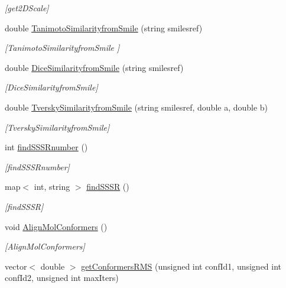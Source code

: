\begin{DoxyCompactItemize}
\begin{DoxyCompactList}\small\item\em \mbox{[}get2\+D\+Scale\mbox{]} \end{DoxyCompactList}\item 
double \mbox{\hyperlink{class_molecule_a2f83a282a6276fb330b46831a29907d6}{Tanimoto\+Similarityfrom\+Smile}} (string smilesref)
\begin{DoxyCompactList}\small\item\em \mbox{[}Tanimoto\+Similarityfrom\+Smile \mbox{]} \end{DoxyCompactList}\item 
double \mbox{\hyperlink{class_molecule_a5dcf9622623a09d43d9a2bc9d381a67e}{Dice\+Similarityfrom\+Smile}} (string smilesref)
\begin{DoxyCompactList}\small\item\em \mbox{[}Dice\+Similarityfrom\+Smile\mbox{]} \end{DoxyCompactList}\item 
double \mbox{\hyperlink{class_molecule_ae2126d53ee2e1488eb7d105c6b02a604}{Tversky\+Similarityfrom\+Smile}} (string smilesref, double a, double b)
\begin{DoxyCompactList}\small\item\em \mbox{[}Tversky\+Similarityfrom\+Smile\mbox{]} \end{DoxyCompactList}\item 
int \mbox{\hyperlink{class_molecule_aaca41709fb5306fbfd11f4a75664e2ed}{find\+S\+S\+S\+Rnumber}} ()
\begin{DoxyCompactList}\small\item\em \mbox{[}find\+S\+S\+S\+Rnumber\mbox{]} \end{DoxyCompactList}\item 
map$<$ int, string $>$ \mbox{\hyperlink{class_molecule_a553c6c6f1543156da2ff00c859f6b508}{find\+S\+S\+SR}} ()
\begin{DoxyCompactList}\small\item\em \mbox{[}find\+S\+S\+SR\mbox{]} \end{DoxyCompactList}\item 
void \mbox{\hyperlink{class_molecule_adc6886a60ec1e7f55ba07d7f2be72e68}{Align\+Mol\+Conformers}} ()
\begin{DoxyCompactList}\small\item\em \mbox{[}Align\+Mol\+Conformers\mbox{]} \end{DoxyCompactList}\item 
vector$<$ double $>$ \mbox{\hyperlink{class_molecule_a98b0a89a7c6275eee5252155fa530e77}{get\+Conformers\+R\+MS}} (unsigned int conf\+Id1, unsigned int conf\+Id2, unsigned int max\+Iters)

\end{DoxyCompactItemize}
